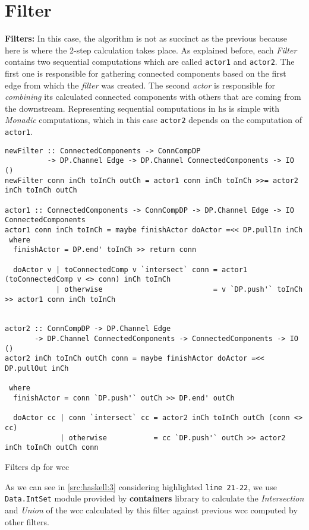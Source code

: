 \section{Filter}\label{filter}
\textbf{Filters:}\newline
In this case, the algorithm is not as succinct as the previous because here is where the 2-step calculation takes place. As explained before, each \textit{Filter} contains two sequential computations which are called \texttt{actor1} and \texttt{actor2}. The first one is responsible for gathering connected components based on the first edge from which the \textit{filter} was created.  The second \textit{actor} is responsible for \textit{combining} its calculated connected components with others that are coming from the downstream. Representing sequential computations in \acrshort{hs} is simple with \emph{Monadic} computations, which in this case \texttt{actor2} depends on the computation of \texttt{actor1}.

\begin{listing}[H]
\begin{verbatim}
newFilter :: ConnectedComponents -> ConnCompDP 
          -> DP.Channel Edge -> DP.Channel ConnectedComponents -> IO ()
newFilter conn inCh toInCh outCh = actor1 conn inCh toInCh >>= actor2 inCh toInCh outCh

actor1 :: ConnectedComponents -> ConnCompDP -> DP.Channel Edge -> IO ConnectedComponents
actor1 conn inCh toInCh = maybe finishActor doActor =<< DP.pullIn inCh
 where
  finishActor = DP.end' toInCh >> return conn

  doActor v | toConnectedComp v `intersect` conn = actor1 (toConnectedComp v <> conn) inCh toInCh
            | otherwise                          = v `DP.push'` toInCh >> actor1 conn inCh toInCh


actor2 :: ConnCompDP -> DP.Channel Edge 
       -> DP.Channel ConnectedComponents -> ConnectedComponents -> IO ()
actor2 inCh toInCh outCh conn = maybe finishActor doActor =<< DP.pullOut inCh

 where
  finishActor = conn `DP.push'` outCh >> DP.end' outCh

  doActor cc | conn `intersect` cc = actor2 inCh toInCh outCh (conn <> cc)
             | otherwise           = cc `DP.push'` outCh >> actor2 inCh toInCh outCh conn
\end{verbatim}
\caption{Filters \acrshort{dp} for \acrshort{wcc}}
\label{src:haskell:3}
\end{listing}

As we can see in \autoref{src:haskell:3} considering highlighted \texttt{line 21-22}, we use \texttt{Data.IntSet} module provided by \textbf{containers} \cite{containers} library to calculate the \textit{Intersection} and \textit{Union} of the \acrshort{wcc} calculated by this filter against  previous \acrshort{wcc} computed by other filters.\label{not:optimal}

\fi
